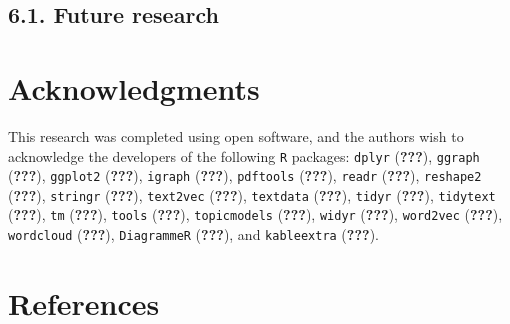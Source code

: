 \documentclass[]{elsarticle} %
\begin{document}
\hypertarget{future-research}{%
\subsection{6.1. Future research}\label{future-research}}

\hypertarget{acknowledgments}{%
\section{Acknowledgments}\label{acknowledgments}}

This research was completed using open software, and the authors wish to
acknowledge the developers of the following \texttt{R} packages:
\texttt{dplyr} ({\textbf{???}}), \texttt{ggraph} ({\textbf{???}}),
\texttt{ggplot2} ({\textbf{???}}), \texttt{igraph} ({\textbf{???}}),
\texttt{pdftools} ({\textbf{???}}), \texttt{readr} ({\textbf{???}}),
\texttt{reshape2} ({\textbf{???}}), \texttt{stringr} ({\textbf{???}}),
\texttt{text2vec} ({\textbf{???}}), \texttt{textdata} ({\textbf{???}}),
\texttt{tidyr} ({\textbf{???}}), \texttt{tidytext} ({\textbf{???}}),
\texttt{tm} ({\textbf{???}}), \texttt{tools} ({\textbf{???}}),
\texttt{topicmodels} ({\textbf{???}}), \texttt{widyr} ({\textbf{???}}),
\texttt{word2vec} ({\textbf{???}}), \texttt{wordcloud} ({\textbf{???}}),
\texttt{DiagrammeR} ({\textbf{???}}), and \texttt{kableextra}
({\textbf{???}}).

\hypertarget{references}{%
\section{References}\label{references}}
\end{document}
